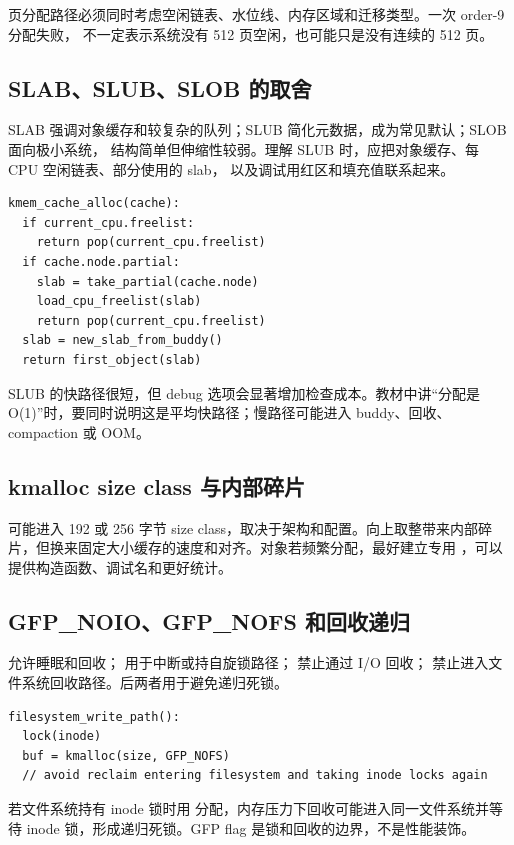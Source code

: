 页分配路径必须同时考虑空闲链表、水位线、内存区域和迁移类型。一次 order-9 分配失败，
不一定表示系统没有 512 页空闲，也可能只是没有连续的 512 页。

\subsection{SLAB、SLUB、SLOB 的取舍}

SLAB 强调对象缓存和较复杂的队列；SLUB 简化元数据，成为常见默认；SLOB 面向极小系统，
结构简单但伸缩性较弱。理解 SLUB 时，应把对象缓存、每 CPU 空闲链表、部分使用的 slab，
以及调试用红区和填充值联系起来。

\begin{lstlisting}
kmem_cache_alloc(cache):
  if current_cpu.freelist:
    return pop(current_cpu.freelist)
  if cache.node.partial:
    slab = take_partial(cache.node)
    load_cpu_freelist(slab)
    return pop(current_cpu.freelist)
  slab = new_slab_from_buddy()
  return first_object(slab)
\end{lstlisting}

SLUB 的快路径很短，但 debug 选项会显著增加检查成本。教材中讲“分配是 O(1)”时，要同时说明这是平均快路径；慢路径可能进入 buddy、回收、compaction 或 OOM。

\subsection{kmalloc size class 与内部碎片}

 可能进入 192 或 256 字节 size class，取决于架构和配置。向上取整带来内部碎片，但换来固定大小缓存的速度和对齐。对象若频繁分配，最好建立专用 ，可以提供构造函数、调试名和更好统计。

\subsection{GFP\_NOIO、GFP\_NOFS 和回收递归}

 允许睡眠和回收； 用于中断或持自旋锁路径； 禁止通过 I/O 回收； 禁止进入文件系统回收路径。后两者用于避免递归死锁。

\begin{lstlisting}
filesystem_write_path():
  lock(inode)
  buf = kmalloc(size, GFP_NOFS)
  // avoid reclaim entering filesystem and taking inode locks again
\end{lstlisting}

若文件系统持有 inode 锁时用  分配，内存压力下回收可能进入同一文件系统并等待 inode 锁，形成递归死锁。GFP flag 是锁和回收的边界，不是性能装饰。

